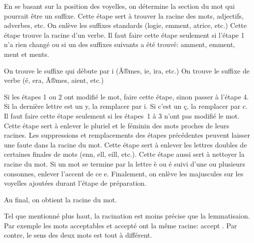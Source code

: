 \begin{itemize}
En se basant sur la position des voyelles, on d\'etermine la section du mot qui pourrait \^etre un suffixe.
Cette \'etape sert \`a trouver la racine des mots, adjectifs, adverbes, etc.
On enl\`eve les suffixes standards (logie, emment, atrice, etc.)
Cette \'etape trouve la racine d'un verbe.
Il faut faire cette \'etape seulement si l'\'etape 1 n'a rien chang\'e ou si un des suffixes suivants a \'et\'e trouv\'e: amment, emment, ment et ments.
\begin{itemize}
%
%
On trouve le suffixe qui d\'ebute par i (Ã®mes, ie, ira, etc.)
On trouve le suffixe de verbe (\'e, era, Ã®mes, aient, etc.)
\end{itemize}
Si les \'etapes 1 ou 2 ont modifi\'e le mot, faire cette \'etape, sinon passer \`a l'\'etape 4.
Si la derni\`ere lettre est un y, la remplacer par i.
Si c'est un \c{c}, la remplacer par c.
Il faut faire cette \'etape seulement si les \'etapes~1 \`a 3 n'ont pas modifi\'e le mot.
Cette \'etape sert \`a enlever le pluriel et le f\'eminin des mots proches de leurs racines.
Les suppressions et remplacements des \'etapes pr\'ec\'edentes peuvent laisser une faute dans la racine du mot.
Cette \'etape sert \`a enlever les lettres doubles de certaines finales de mots (enn, ell, eill, etc.).
Cette \'etape aussi sert \`a nettoyer la racine du mot.
Si un mot se termine par la lettre {\`e ou \'e} suivi d'une ou plusieurs consonnes, enlever l'accent de ce {e}.
Finalement, on enl\`eve les majuscules sur les voyelles ajout\'ees durant l'\'etape de pr\'eparation.
\end{itemize}
Au final, on obtient la racine du mot.

Tel que mentionn\'e plus haut, la racination est moins pr\'ecise que la lemmatisaion.
Par exemple les mots \og acceptables \fg{} et \og accept\'e \fg{} ont la m\^eme racine: \og accept \fg{}.
Par contre, le sens des deux mots est tout \`a diff\'erent.


